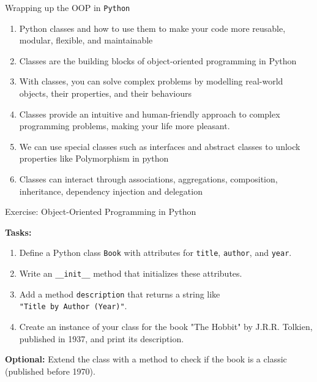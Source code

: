 \documentclass[10pt]{beamer}
\begin{document}
\begin{frame}[fragile]{Wrapping up the OOP in \texttt{Python}}


\begin{enumerate}
\item Python classes and how to use them to make your code more reusable, modular, flexible, and maintainable
\item Classes are the building blocks of object-oriented programming in Python
\item With classes, you can solve complex problems by modelling real-world objects, their properties, and their behaviours
\item Classes provide an intuitive and human-friendly approach to complex programming problems, making your life more pleasant.
\item We can use special classes such as interfaces and abstract classes to unlock properties like Polymorphism in python
\item Classes can interact through associations, aggregations, composition, inheritance, dependency injection and delegation 
\end{enumerate}

\end{frame}

\begin{frame}{Exercise: Object-Oriented Programming in Python}

\textbf{Tasks:}
\begin{enumerate}
\item Define a Python class \texttt{Book} with attributes for \texttt{title}, \texttt{author}, and \texttt{year}.
\item Write an \texttt{\_\_init\_\_} method that initializes these attributes.
\item Add a method \texttt{description} that returns a string like \\
\texttt{"Title by Author (Year)"}.
\item Create an instance of your class for the book "The Hobbit" by J.R.R. Tolkien, published in 1937, and print its description.
\end{enumerate}

\vspace{2mm}
\textbf{Optional:} Extend the class with a method to check if the book is a classic (published before 1970).
\end{frame}
\end{document}
